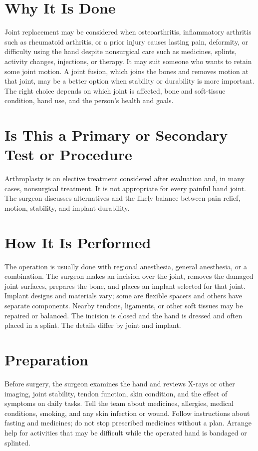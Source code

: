 \section*{Why It Is Done}
Joint replacement may be considered when osteoarthritis, inflammatory arthritis such as rheumatoid arthritis, or a prior injury causes lasting pain, deformity, or difficulty using the hand despite nonsurgical care such as medicines, splints, activity changes, injections, or therapy. It may suit someone who wants to retain some joint motion. A joint fusion, which joins the bones and removes motion at that joint, may be a better option when stability or durability is more important. The right choice depends on which joint is affected, bone and soft-tissue condition, hand use, and the person's health and goals.

\section*{Is This a Primary or Secondary Test or Procedure}
Arthroplasty is an elective treatment considered after evaluation and, in many cases, nonsurgical treatment. It is not appropriate for every painful hand joint. The surgeon discusses alternatives and the likely balance between pain relief, motion, stability, and implant durability.

\section*{How It Is Performed}
The operation is usually done with regional anesthesia, general anesthesia, or a combination. The surgeon makes an incision over the joint, removes the damaged joint surfaces, prepares the bone, and places an implant selected for that joint. Implant designs and materials vary; some are flexible spacers and others have separate components. Nearby tendons, ligaments, or other soft tissues may be repaired or balanced. The incision is closed and the hand is dressed and often placed in a splint. The details differ by joint and implant.

\section*{Preparation}
Before surgery, the surgeon examines the hand and reviews X-rays or other imaging, joint stability, tendon function, skin condition, and the effect of symptoms on daily tasks. Tell the team about medicines, allergies, medical conditions, smoking, and any skin infection or wound. Follow instructions about fasting and medicines; do not stop prescribed medicines without a plan. Arrange help for activities that may be difficult while the operated hand is bandaged or splinted.

